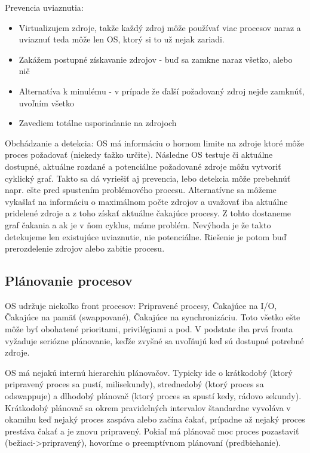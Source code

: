 \documentclass[a4paper,10pt]{article}
\begin{document}
\begin{multicols}{2}
		Prevencia uviaznutia:
		
		\begin{itemize}
			\item Virtualizujem zdroje, takže každý zdroj môže používať viac procesov naraz a uviaznuť teda môže len OS, ktorý si to už nejak zariadi.
			\item Zakážem postupné získavanie zdrojov - buď sa zamkne naraz všetko, alebo nič
			\item Alternatíva k minulému - v prípade že ďalší požadovaný zdroj nejde zamknúť, uvoľním všetko 
			\item Zavediem totálne usporiadanie na zdrojoch 
		\end{itemize}
		
		Obchádzanie a detekcia: OS má informáciu o hornom limite na zdroje ktoré môže proces požadovať (niekedy ťažko určite). Následne OS testuje či aktuálne dostupné, aktuálne rozdané a potenciálne požadované zdroje môžu vytvoriť cyklický graf. Takto sa dá vyriešiť aj prevencia, lebo detekcia môže prebehnúť napr. ešte pred spustením problémového procesu. Alternatívne sa môžeme vykašlať na informáciu o maximálnom počte zdrojov a uvažovať iba aktuálne pridelené zdroje a z toho získať aktuálne čakajúce procesy. Z tohto dostaneme graf čakania a ak je v ňom cyklus, máme problém. Nevýhoda je že takto detekujeme len existujúce uviaznutie, nie potenciálne. Riešenie je potom buď prerozdelenie zdrojov alebo zabitie procesu.
		
	\subsection{Plánovanie procesov}
	
		OS udržuje niekoľko front procesov: Pripravené procesy, Čakajúce na I/O, Čakajúce na pamäť (swappované), Čakajúce na synchronizáciu. Toto všetko ešte môže byť obohatené prioritami, privilégiami a pod. V podstate iba prvá fronta vyžaduje seriózne plánovanie, keďže zvyšné sa uvoľňujú keď sú dostupné potrebné zdroje. 
		
		OS má nejakú internú hierarchiu plánovačov. Typicky ide o krátkodobý (ktorý pripravený proces sa pustí, milisekundy), strednedobý (ktorý proces sa odswappuje) a dlhodobý plánovač (ktorý proces sa spustí kedy, rádovo sekundy). Krátkodobý plánovač sa okrem pravidelných intervalov štandardne vyvoláva v okamihu keď nejaký proces zaspáva alebo začína čakať, prípadne až nejaký proces prestáva čakať a je znovu pripravený. Pokiaľ má plánovač moc proces pozastaviť (bežiaci->pripravený), hovoríme o preemptívnom plánovaní (predbiehanie).
		

\end{multicols}
\end{document}
